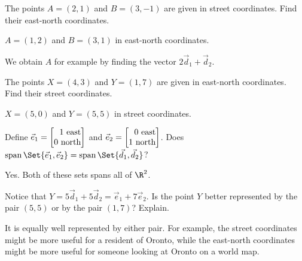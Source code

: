 \documentclass{problemset}
\newcommand{\displayonlynewpage}{\begin{displayonly}\newpage\end{displayonly}}
\newcommand{\bookonlynewpage}{\begin{bookonly}\newpage\end{bookonly}}
\begin{document}
	\begin{parts}
		\item The points $A=(2,1)$ and $B=(3,-1)$ are given in street coordinates.
			Find their east-north coordinates.
			\begin{solution}
				$A=(1,2)$ and $B=(3,1)$ in east-north coordinates.

				We obtain $A$ for example by finding the vector $2\vec d_1+\vec d_2$.
			\end{solution}
		\item The points $X=(4,3)$ and $Y=(1,7)$ are given in east-north coordinates.
			Find their street coordinates.
			\begin{solution}[inline]
				$X=(5,0)$ and $Y=(5,5)$ in street coordinates.
			\end{solution}
		\item Define $\vec e_1=\mat{1\text{ east}\\0\text{ north}}$ and
			$\vec e_2=\mat{0\text{ east}\\1\text{ north}}$.
			Does $\Span\Set{\vec e_1,\vec e_2} = \Span\Set{\vec d_1,\vec d_2}$?
			\begin{solution}
				Yes. Both of these sets spans all of $\R^2$.
			\end{solution}
		\item Notice that $Y=5\vec d_1+5\vec d_2 = \vec e_1+7\vec e_2$. Is the point $Y$
			better represented by the pair $(5,5)$ or by the pair $(1,7)$? Explain.
			\begin{solution}
				It is equally well represented by either pair. For example, the
				street coordinates might be more useful for a resident of Oronto,
				while the east-north coordinates might be more useful for someone
				looking at Oronto on a world map.
			\end{solution}
	\end{parts}

\displayonlynewpage
	\bookonlynewpage
\end{document}
